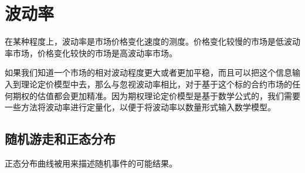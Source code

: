 \chapter{波动率}
在某种程度上，波动率是市场价格变化速度的测度。价格变化较慢的市场是低波动率市场，价格变化较快的市场是高波动率市场。

如果我们知道一个市场的相对波动程度更大或者更加平稳，而且可以把这个信息输入到理论定价模型中去，那么与忽视波动率相比，对于基于这个标的合约市场的任何期权的估值都会更加精准。因为期权理论定价模型是基于数学公式的，我们需要一些方法将波动率进行定量化，以便于将波动率以数量形式输入数学模型。
\section{随机游走和正态分布}
正态分布曲线被用来描述随机事件的可能结果。